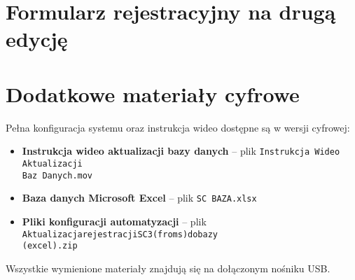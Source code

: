 \chapter{Formularz rejestracyjny na drugą edycję}
\label{app:formularz}

\chapter{Dodatkowe materiały cyfrowe}
\label{app:materialy}

Pełna konfiguracja systemu oraz instrukcja wideo dostępne są w wersji cyfrowej:  
\begin{itemize}
    \item \textbf{Instrukcja wideo aktualizacji bazy danych} -- plik \texttt{Instrukcja Wideo Aktualizacji \\Baz Danych.mov}
    
    \item \textbf{Baza danych Microsoft Excel} -- plik \texttt{SC BAZA.xlsx}
    
     \item \textbf{Pliki konfiguracji automatyzacji} -- plik \texttt{AktualizacjarejestracjiSC3(froms)dobazy\\(excel).zip}
\end{itemize}

Wszystkie wymienione materiały znajdują się na dołączonym nośniku USB.